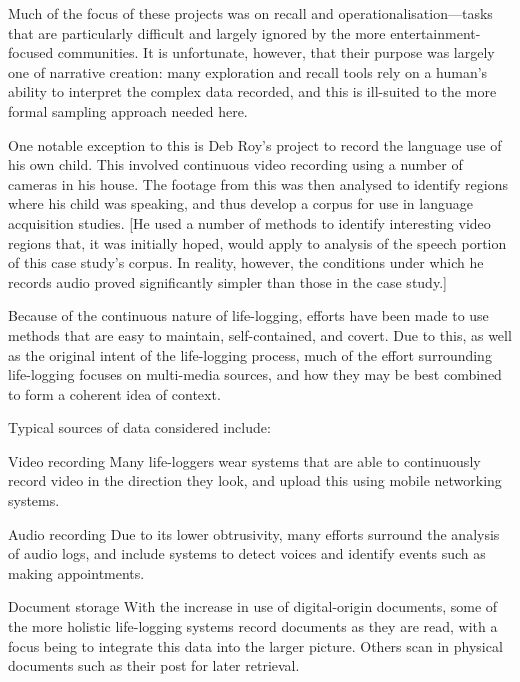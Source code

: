 Much of the focus of these projects was on recall and operationalisation---tasks that are particularly difficult and largely ignored by the more entertainment-focused communities.  It is unfortunate, however, that their purpose was largely one of narrative creation: many exploration and recall tools rely on a human's ability to interpret the complex data recorded, and this is ill-suited to the more formal sampling approach needed here.

One notable exception to this is Deb Roy's project to record the language use of his own child.  This involved continuous video recording using a number of cameras in his house.  The footage from this was then analysed to identify regions where his child was speaking, and thus develop a corpus for use in language acquisition studies.  [He used a number of methods to identify interesting video regions that, it was initially hoped, would apply to analysis of the speech portion of this case study's corpus.  In reality, however, the conditions under which he records audio proved significantly simpler than those in the case study.]





Because of the continuous nature of life-logging, efforts have been made to use methods that are easy to maintain, self-contained, and covert.  Due to this, as well as the original intent of the life-logging process, much of the effort surrounding life-logging focuses on multi-media sources, and how they may be best combined to form a coherent idea of context.  

Typical sources of data considered include:

\begin{itemizeTitle}
    \item[Video recording] Many life-loggers wear systems that are able to continuously record video in the direction they look, and upload this using mobile networking systems.
    \item[Audio recording] Due to its lower obtrusivity, many efforts surround the analysis of audio logs, and include systems to detect voices and identify events such as making appointments.
    \item[Document storage] With the increase in use of digital-origin documents, some of the more holistic life-logging systems record documents as they are read, with a focus being to integrate this data into the larger picture.  Others scan in physical documents such as their post for later retrieval.
\end{itemizeTitle}

